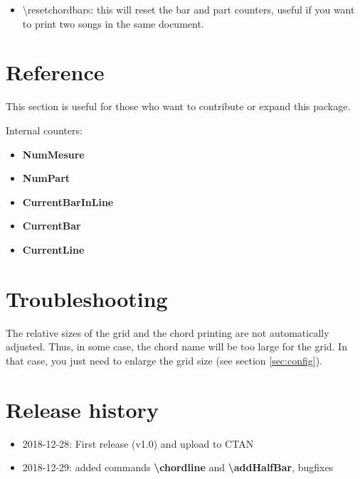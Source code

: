 \documentclass[11pt]{article}
\newcommand{\btt}{\bfseries \ttfamily }
\newcommand{\tbs}{\textbackslash{}}
\begin{document}
\begin{itemize}
\noindent
\begin{minipage}{0.45\textwidth}

\end{minipage}
%
\begin{minipage}{0.42\textwidth}
\countbarsNo

\end{minipage}

\item {\ttfamily \textbackslash resetchordbars}: this will reset the bar and part counters, useful if you want to print two songs in the same document.
\end{itemize}


\section{Reference}

This section is useful for those who want to contribute or expand this package.

Internal counters:

\begin{itemize}
\item {\btt NumMesure}
\item {\btt NumPart}
\item {\btt CurrentBarInLine}
\item {\btt CurrentBar}
\item {\btt CurrentLine}
\end{itemize}

\section{Troubleshooting}

The relative sizes of the grid and the chord printing are not automatically adjusted.
Thus, in some case, the chord name will be too large for the grid.
In that case, you just need to enlarge the grid size (see section \ref {sec:config}).

\section{Release history}

\begin{itemize}
\item 2018-12-28: First release (v1.0) and upload to CTAN

\item 2018-12-29: added commands {\btt \tbs chordline} and {\btt \tbs addHalfBar}, bugfixes
\end{itemize}
\end{document}
